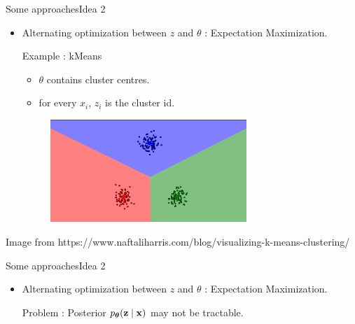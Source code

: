 \documentclass{beamer}
\begin{document}
\begin{frame}{Some approaches}{Idea 2}
    \begin{itemize}
        \item {
            Alternating optimization between $z$ and $\theta$ : Expectation Maximization.

            \vspace{3mm}
            Example : kMeans
            \begin{itemize}
                \item $\theta$ contains cluster centres.
                \item for every $x_i$, $z_i$ is the cluster id.
            \end{itemize}
        }
        \begin{figure}
            \centering
            \includegraphics[width=0.7\textwidth]{kmeans6}
        \end{figure}
    \end{itemize}
    {\small Image from https://www.naftaliharris.com/blog/visualizing-k-means-clustering/}
\end{frame}

\begin{frame}{Some approaches}{Idea 2}
    \begin{itemize}
        \item {
            Alternating optimization between $z$ and $\theta$ : Expectation Maximization.
        }

        \vspace{3mm}
        Problem : Posterior $p_{\boldsymbol{\theta}}(\mathbf{z} \mid \mathbf{x})$ may not be tractable.
    \end{itemize}
\end{frame}




\end{document}
